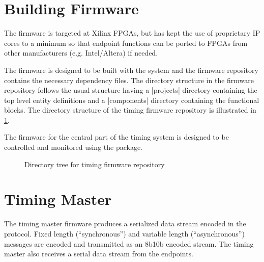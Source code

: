 \documentclass{dune}
\begin{document}
\section{Building Firmware}

The firmware is targeted at Xilinx FPGAs, but has kept the use of proprietary IP cores to a minimum so that endpoint functions can be ported to FPGAs from other manufacturers (e.g. Intel/Altera) if needed.

The firmware is designed to be built with the  system and the firmware repository contains the necessary dependency files. The directory structure in the firmware repository follows the usual  structure having a |projects| directory containing the top level entity definitions and a |components| directory containing the functional blocks. The directory structure of the timing firmware repository is illustrated in \ref{fig:timingRepoDirectories}.

The firmware for the central part of the timing system is designed to be controlled and monitored using the  package.

\begin{figure}[h!]
\renewcommand*\DTstylecomment{\color{blue}}
\renewcommand*\DTstyle{\ttfamily\textcolor{red}}
    \caption{Directory tree for timing firmware repository}
    \label{fig:timingRepoDirectories}
\end{figure}

\section{Timing Master}

The timing master firmware produces a serialized data stream encoded in the    protocol\cite{ref:dts-sp-timing-protocol}. Fixed length (``synchronous'') and variable length (``asynchronous'') messages are encoded and transmitted as an 8b10b encoded stream. The timing master also receives a serial data stream from the endpoints.
\end{document}
